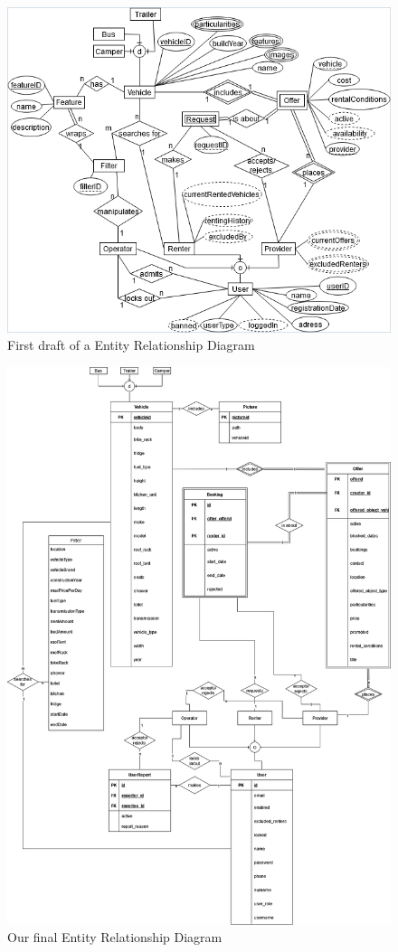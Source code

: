 \begin{figure}[h]
	\centering
	\includegraphics[width=12cm]{resources/images/ER-diagram_first.png}
	\caption{First draft of a Entity Relationship Diagram}
	\label{fig:er-diagram_draft}
\end{figure}
\begin{figure}[h]
	\centering
	\includegraphics[width=15cm]{resources/images/ER-diagram_final.png}
	\caption{Our final Entity Relationship Diagram}
	\label{fig:er-diagram}
\end{figure}

